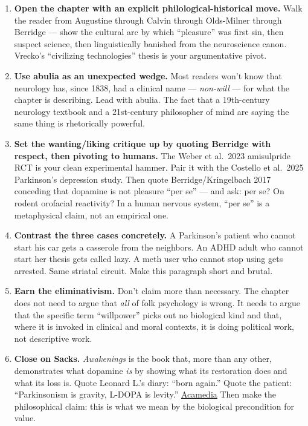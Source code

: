 \begin{enumerate}
\def\labelenumi{\arabic{enumi}.}
\tightlist
\item
  \textbf{Open the chapter with an explicit philological-historical move.} Walk the reader from Augustine through Calvin through Olds-Milner through Berridge --- show the cultural arc by which ``pleasure'' was first sin, then suspect science, then linguistically banished from the neuroscience canon. Vrecko's ``civilizing technologies'' thesis is your argumentative pivot.
\item
  \textbf{Use abulia as an unexpected wedge.} Most readers won't know that neurology has, since 1838, had a clinical name --- \emph{non-will} --- for what the chapter is describing. Lead with abulia. The fact that a 19th-century neurology textbook and a 21st-century philosopher of mind are saying the same thing is rhetorically powerful.
\item
  \textbf{Set the wanting/liking critique up by quoting Berridge with respect, then pivoting to humans.} The Weber et al.~2023 amisulpride RCT is your clean experimental hammer. Pair it with the Costello et al.~2025 Parkinson's depression study. Then quote Berridge/Kringelbach 2017 conceding that dopamine is not pleasure ``per se'' --- and ask: per se? On rodent orofacial reactivity? In a human nervous system, ``per se'' is a metaphysical claim, not an empirical one.
\item
  \textbf{Contrast the three cases concretely.} A Parkinson's patient who cannot start his car gets a casserole from the neighbors. An ADHD adult who cannot start her thesis gets called lazy. A meth user who cannot stop using gets arrested. Same striatal circuit. Make this paragraph short and brutal.
\item
  \textbf{Earn the eliminativism.} Don't claim more than necessary. The chapter does not need to argue that \emph{all} of folk psychology is wrong. It needs to argue that the specific term ``willpower'' picks out no biological kind and that, where it is invoked in clinical and moral contexts, it is doing political work, not descriptive work.
\item
  \textbf{Close on Sacks.} \emph{Awakenings} is the book that, more than any other, demonstrates what dopamine \emph{is} by showing what its restoration does and what its loss is. Quote Leonard L.'s diary: ``born again.'' Quote the patient: ``Parkinsonism is gravity, L-DOPA is levity.'' \href{http://www.acamedia.info/literature/alexanders_feast/awakenings/excerpts.htm}{Acamedia} Then make the philosophical claim: this is what we mean by the biological precondition for value.
\end{enumerate}

